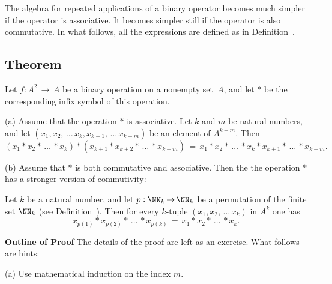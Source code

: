 \VV

        The algebra for repeated applications of a binary operator becomes much simpler if the operator is associative.
    It becomes simpler still if the operator is also commutative. In what follows, all the expressions are defined as in Definition~.

            \subsection{\small{\bf Theorem}}
            \label{ThmA60.50}

        Let $f:A^{2} \,{\rightarrow}\, A$ be a binary operation on a nonempty set~$A$, and let ${\ast}$ be the corresponding infix symbol of this operation.

\V

        (a) Assume that the operation ${\ast}$ is associative. Let $k$ and $m$ be natural numbers,
    and let $(x_{1}, x_{2},\,{\ldots}\,x_{k}, x_{k+1},\,{\ldots}\,x_{k+m})$ be an element of $A^{k+m}$. Then
        \begin{displaymath}
        \left(x_{1}{\ast}x_{2}{\ast}\,{\ldots}\,{\ast}x_{k}\right)
    {\ast}
        \left(x_{k+1}{\ast}x_{k+2}{\ast}\,{\ldots}\,{\ast}x_{k+m}\right)
     \,=\, 
  x_{1}{\ast}x_{2}{\ast}\,{\ldots}\, {\ast}x_{k}{\ast}x_{k+1}{\ast}\,{\ldots}\,{\ast}x_{k+m}.
        \end{displaymath}
    
\V

        (b) Assume that ${\ast}$ is both commutative and associative. Then the the operation ${\ast}$ has a stronger version of commutivity:

        Let $k$ be a natural number, and let $p:{\NN}_{k} \,{\rightarrow}\, {\NN}_{k}$ be a permutation of the finite set ${\NN}_{k}$
    (see Definition~).
    Then for every $k$-tuple $(x_{1}, x_{2},\,{\ldots}\,x_{k})$ in $A^{k}$ one has
        \begin{displaymath}
        x_{p(1)}{\ast}x_{p(2)}{\ast}\,{\ldots}\,{\ast}x_{p(k)} \,=\, 
        x_{1}{\ast}x_{2}{\ast}\,{\ldots}\,{\ast}x_{k}.
        \end{displaymath}

\V

        {\bf Outline of Proof} The details of the proof are left as an exercise. What follows are hints:

        (a) Use mathematical induction on the index $m$.

\V

